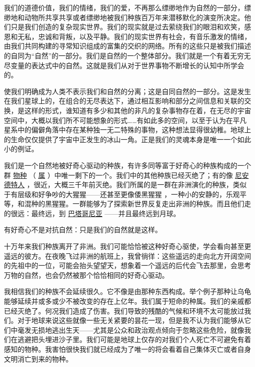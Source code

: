    我们的道德价值，我们的情绪，我们的爱，不再那么缥缈地作为自然的一部分，缥缈地和动物所共享共享或者缥缈地被我们种族百万年来潜移默化的演变所决定。他们只是我们创造的复杂现实世界。我们的现实就是过去萦绕我们的眼泪和欢笑，感恩和无私，忠诚和背叛，以及平静。我们的现实世界有社会，有音乐激发的情绪，由我们共同构建的寻常知识组成的富集的交织的网络。所有的这些只是被我们描述的自同为“自然”的一部分。我们是自然的一个整体部分。我们就是一个有着无穷无尽变量的表达式中的自然。这就是我们从对于世界事物不断增长的认知中所学会的。
 
    使我们明确成为人类不表示我们和自然的分离；这是自同自然的一部分。这是发生在我们星球上的，在组合的无尽表达下，通过相互影响和部分之间信息和关联的交换，是这样的形式，谁知道有多少和其他的非凡的复杂事物存在着，在无尽的宇宙空间中，大概以我们所不可能想象的形式……有如此多的空间，以至于认为在平凡星系中的偏僻角落中存在某种独一无二特殊的事物，这种想法显得很幼稚。地球上的生命仅仅提供了宇宙中正发生的冰山一角。正是我们的灵魂本身是唯一一个如此小的例证。

    我们是一个自然地被好奇心驱动的种族，有许多同等富于好奇心的种族构成的一个群
\href{http://toyhouse.cc/wiki/index.php/物种}{物种}
（
\href{http://toyhouse.cc/wiki/index.php/属}{属}
）中唯一剩下的一个。我们中的其他种族已经灭绝了；有的像
\href{http://toyhouse.cc/wiki/index.php/尼安德特人}{尼安德特人}
，很近，大概三千年前灭绝。我们所属的是一群在非洲演化的种族，类似于有层级和好争吵的大猩猩——还甚至更像倭黑猩猩
，一种小的安静的，乐观平等，和混种的黑猩猩。一群能够为了探索新世界反复走出非洲的种族。而且他们走的很远：最终远，到
\href{http://toyhouse.cc/wiki/index.php/巴塔哥尼亚}{巴塔哥尼亚}
——并且最终远到月球。

    有好奇心不是对抗自然：只是我们的自然就是这样。
 
   十万年来我们种族离开了非洲。我们可能恰恰被这种好奇心驱使，学会看向甚至更遥远的彼方。在夜晚飞过非洲的航班上，我曾徜徉：这些遥远的走向北方开阔空间的先祖中的一位，可能会抬头望望天，想象着一个遥远的后代会飞去那里，会思考万物的自然，也会仍然被那个恰恰相同的好奇心驱动。

    我相信我们的种族不会延续很久。它不像是由那种东西构成。举个例子那种让乌龟能够延续并或多或少不被改变的存在上亿年。我们属于短命的种属。我们的亲戚都已经灭绝了。何况我们造成了伤害。我们导致的残酷的气候和环境不太可能放过我们。对于地球来说这些就像一些无关紧要的昙花一现，但是我不认为我们能够从它们中毫发无损地逃出生天——尤其是公众和政治观点倾向于忽略这些危险，就像我们在逃避把头埋进沙子里。我们可能是地球上仅存的对我们个人死亡不可避免有着感知的物种。我害怕很快我们就已经成为了唯一的将会看着自己集体灭亡或者自身文明消亡到来的物种。

